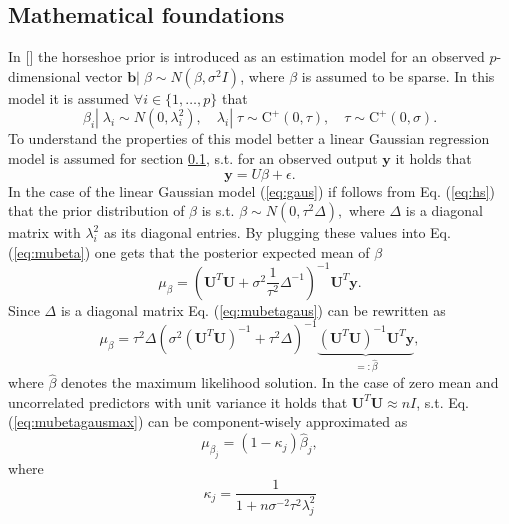 \documentclass[12pt,letterpaper]{article}
\numberwithin{equation}{subsection}
\begin{document}
\subsection{Mathematical foundations}
\label{sec:mfound}
In [\cite{Carvalho2010}] the horseshoe prior is introduced as an estimation model for an observed $p$-dimensional vector $\mathbf{b}|\; \beta \sim N(\beta, \sigma^2I)$, where $\beta$ is assumed to be sparse.
In this model it is assumed $\forall i \in \{1,\dots,p\}$ that
\begin{equation}
\beta_i |\; \lambda_i \sim N(0,\lambda^2_i),\quad \lambda_i |\; \tau \sim \text{C}^+(0, \tau), \quad \tau \sim  \text{C}^+(0, \sigma).
\label{eq:hs}
\end{equation}
To understand the properties of this model better a linear Gaussian regression model is assumed for section \ref{sec:mfound}, s.t. for an observed output $\mathbf{y}$ it holds that 
\begin{equation}
\mathbf{y} = U\beta + \epsilon.
\label{eq:gaus}
\end{equation}
In the case of the linear Gaussian model (\ref{eq:gaus}) if follows from Eq. (\ref{eq:hs}) that the prior distribution of $\beta$ is s.t. $\beta \sim N(0, \tau^2\Delta), $ where $\Delta$ is a diagonal matrix with $\lambda_i^2$ as its diagonal entries. By plugging these values into Eq. (\ref{eq:mubeta}) one gets that the posterior expected mean of $\beta$
\begin{equation}
\mu_\beta = (\mathbf{U}^T\mathbf{U} + \sigma^2 \frac{1}{\tau^2}\Delta^{-1})^{-1}\mathbf{U}^T\mathbf{y}.
\label{eq:mubetagaus}
\end{equation}
Since $\Delta$ is a diagonal matrix Eq. (\ref{eq:mubetagaus}) can be rewritten as 
\begin{equation}
\mu_\beta = \tau^2\Delta(\sigma^2(\mathbf{U}^T\mathbf{U} )^{-1} + \tau^2\Delta)^{-1}\underbrace{(\mathbf{U}^T\mathbf{U} )^{-1}\mathbf{U}^T\mathbf{y}}_{=:\hat{\beta}},
\label{eq:mubetagausmax}
\end{equation}
where $\hat{\beta}$ denotes the maximum likelihood solution. In the case of zero mean and uncorrelated predictors with unit variance it holds that $\mathbf{U}^T\mathbf{U} \approx nI$, s.t. Eq. (\ref{eq:mubetagausmax}) can be component-wisely approximated as 
\begin{equation}
\mu_{\beta_j} = (1-\kappa_j)\hat{\beta}_j,
\end{equation}
where 
\begin{equation}
\kappa_j = \frac{1}{1+n\sigma^{-2}\tau^2\lambda^2_j}
\end{equation}
\end{document}
